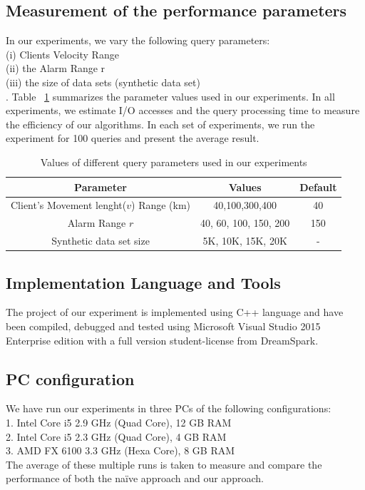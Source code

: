 \subsection{Measurement of the performance parameters}
In our experiments, we vary the following query parameters:\\ (i) Clients Velocity Range\\ (ii) the Alarm Range r\\ (iii) the size of data sets (synthetic data set)\\. Table ~\ref{table:exp_setup} summarizes the parameter values used in our experiments. In all experiments, we estimate I/O accesses and the query processing time to measure the efficiency of our algorithms. In each set of experiments, we run the experiment for 100 queries and present the average result.
\vspace*{10pt}
\begin{table}[htbp]
  \centering

\begin{tabular}{|c|c|c|}  \hline
  Parameter& Values & Default\\
  \hline
  Client’s Movement lenght($ v $) Range (km) & 40,100,300,400 &40 \\
  \hline
  Alarm Range $r$& 40, 60, 100, 150,  200 &150\\
  \hline
  Synthetic data set size & 5K, 10K, 15K, 20K & - \\
  \hline
\end{tabular}
\caption{Values of different query parameters used in our experiments} \label{table:exp_setup} \vspace{-2mm}
\end{table}


\subsection{Implementation Language and Tools}
The project of our experiment is implemented using C++ language and have been compiled, debugged and tested using Microsoft Visual Studio 2015 Enterprise edition with a full version student-license from DreamSpark.

\subsection{PC configuration}
We have run our experiments in three PCs of the following configurations:\\
1. Intel Core i5 2.9 GHz (Quad Core), 12 GB RAM \\
2. Intel Core i5 2.3 GHz (Quad Core), 4 GB RAM \\
3. AMD FX 6100 3.3 GHz (Hexa Core), 8 GB RAM \\
The average of these multiple runs is taken to measure and compare the performance of both the naïve approach and our approach.


